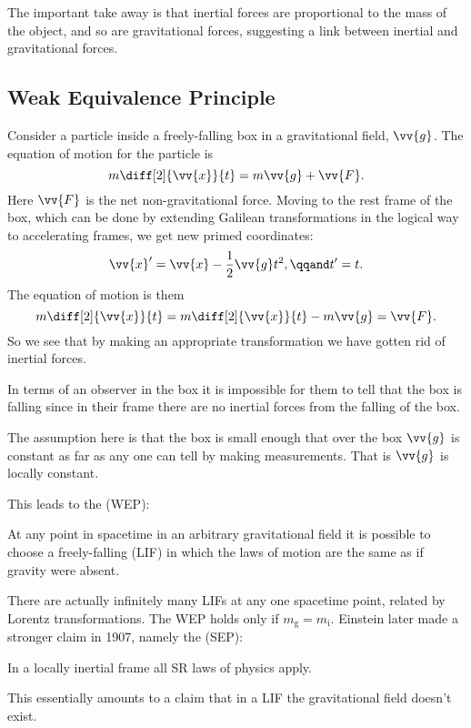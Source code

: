 \documentclass[fleqn]{NotesClass}
\begin{document}
    The important take away is that inertial forces are proportional to the mass of the object, and so are gravitational forces, suggesting a link between inertial and gravitational forces.
    
    \subsection{Weak Equivalence Principle}
    Consider a particle inside a freely-falling box in a gravitational field, \(\vv{g}\).
    The equation of motion for the particle is
    \begin{equation}
        m\diff[2]{\vv{x}}{t} = m\vv{g} + \vv{F}.
    \end{equation}
    Here \(\vv{F}\) is the net non-gravitational force.
    Moving to the rest frame of the box, which can be done by extending Galilean transformations in the logical way to accelerating frames, we get new primed coordinates:
    \begin{equation}
        \vv{x}' = \vv{x} - \frac{1}{2}\vv{g}t^2, \qqand t' = t.
    \end{equation}
    The equation of motion is them
    \begin{equation}
        m \diff[2]{\vv{x}}{t} = m\diff[2]{\vv{x}}{t} - m\vv{g} = \vv{F}.
    \end{equation}
    So we see that by making an appropriate transformation we have gotten rid of inertial forces.
    
    In terms of an observer in the box it is impossible for them to tell that the box is falling since in their frame there are no inertial forces from the falling of the box.
    
    \begin{rmk}
        The assumption here is that the box is small enough that over the box \(\vv{g}\) is constant as far as any one can tell by making measurements.
        That is \(\vv{g}\) is locally constant.
    \end{rmk}
    
    This leads to the  (WEP):
    \begin{important}
        At any point in spacetime in an arbitrary gravitational field it is possible to choose a freely-falling  (LIF) in which the laws of motion are the same as if gravity were absent.
    \end{important}
    
    There are actually infinitely many LIFs at any one spacetime point, related by Lorentz transformations.
    The WEP holds only if \(m_{\mathrm{g}} = m_{\mathrm{i}}\).
    Einstein later made a stronger claim in 1907, namely the  (SEP):
    \begin{important}
        In a locally inertial frame all SR laws of physics apply.
    \end{important}
    This essentially amounts to a claim that in a LIF the gravitational field doesn't exist.
    
\end{document}
